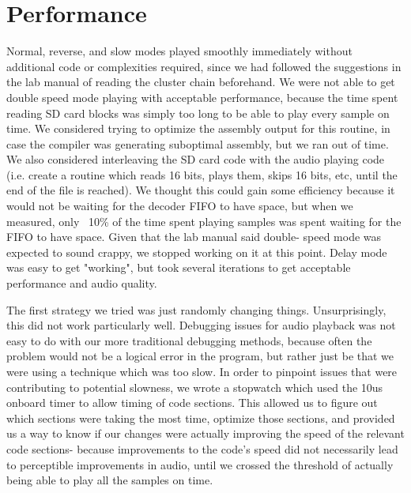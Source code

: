 \documentclass[12pt]{article}
\begin{document}
\section{Performance}
Normal, reverse, and slow modes played smoothly immediately without additional
code or complexities required, since we had followed the suggestions in the
lab manual of reading the cluster chain beforehand. We were not able to get
double speed mode playing with acceptable performance, because the time spent
reading SD card blocks was simply too long to be able to play every sample on
time. We considered trying to optimize the assembly output for this routine,
in case the compiler was generating suboptimal assembly, but we ran out of
time. We also considered interleaving the SD card code with the audio playing
code (i.e. create a routine which reads 16 bits, plays them, skips 16 bits,
etc, until the end of the file is reached). We thought this could gain some
efficiency because it would not be waiting for the decoder FIFO to have space,
but when we measured, only ~10\% of the time spent playing samples was spent
waiting for the FIFO to have space. Given that the lab manual said double-
speed mode was expected to sound crappy, we stopped working on it at this
point. Delay mode was easy to get "working", but took several iterations to
get acceptable performance and audio quality.



The first strategy we tried was just randomly changing things. Unsurprisingly,
this did not work particularly well. Debugging issues for audio playback
was not easy to do with our more traditional debugging methods, because often
the problem would not be a logical error in the program, but rather just be
that we were using a technique which was too slow. In order to pinpoint issues
that were contributing to potential slowness, we wrote a stopwatch which used
the 10us onboard timer to allow timing of code sections. This allowed us to
figure out which sections were taking the most time, optimize those sections,
and provided us a way to know if our changes were actually improving the speed
of the relevant code sections- because improvements to the code's speed did
not necessarily lead to perceptible improvements in audio, until we crossed
the threshold of actually being able to play all the samples on time.
\end{document}
